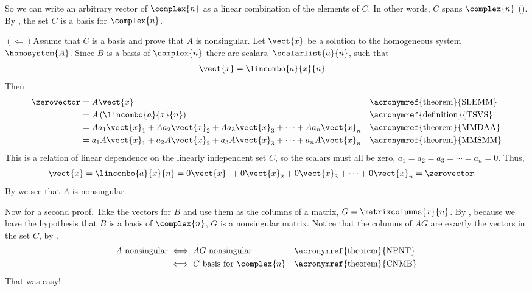 %
So we can write an arbitrary vector of $\complex{n}$ as a linear combination of the elements of $C$.  In other words, $C$ spans $\complex{n}$ ().  By , the set $C$ is a basis for $\complex{n}$.\par
%
$\left(\Leftarrow\right)$\quad  Assume that $C$ is a basis and prove that $A$ is nonsingular.  Let $\vect{x}$ be a solution to the homogeneous system $\homosystem{A}$.  Since $B$ is a basis of $\complex{n}$ there are  scalars, $\scalarlist{a}{n}$, such that
%
\begin{align*}
\vect{x}&=\lincombo{a}{x}{n}
\end{align*}
%
Then
%
\begin{align*}
\zerovector
&=A\vect{x}
&&\text{\acronymref{theorem}{SLEMM}}\\
%
&=A\left(\lincombo{a}{x}{n}\right)
&&\text{\acronymref{definition}{TSVS}}\\
%
&=
Aa_1\vect{x}_1+
Aa_2\vect{x}_2+
Aa_3\vect{x}_3+
\cdots+
Aa_n\vect{x}_n
&&\text{\acronymref{theorem}{MMDAA}}\\
%
&=
a_1A\vect{x}_1+
a_2A\vect{x}_2+
a_3A\vect{x}_3+
\cdots+
a_nA\vect{x}_n
&&\text{\acronymref{theorem}{MMSMM}}
%
\end{align*}
%
This is a relation of linear dependence on the linearly independent set $C$, so the scalars must all be zero, $a_1=a_2=a_3=\cdots=a_n=0$.  Thus,
%
\begin{align*}
\vect{x}&=\lincombo{a}{x}{n}=0\vect{x}_1+0\vect{x}_2+0\vect{x}_3+\cdots+0\vect{x}_n=\zerovector.
\end{align*}
%
By  we see that $A$ is nonsingular.\par
%
\medskip
%
Now for a second proof.  Take the vectors for $B$ and use them as the columns of a matrix, $G=\matrixcolumns{x}{n}$.  By , because we have the hypothesis that $B$ is a basis of $\complex{n}$, $G$ is a nonsingular matrix.  Notice that the columns of $AG$ are exactly the vectors in the set $C$, by .
%
\begin{align*}
A\text{ nonsingular}
&\iff AG\text{ nonsingular}
&&\text{\acronymref{theorem}{NPNT}}\\
%
&\iff C\text{ basis for }\complex{n}
&&\text{\acronymref{theorem}{CNMB}}\\
\end{align*}
%
That was easy!



